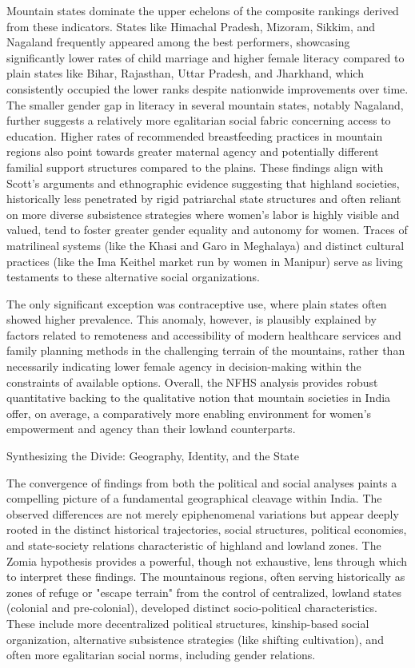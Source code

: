 \begin{sloppypar}
Mountain states dominate the upper echelons of the composite rankings derived from these indicators. States like Himachal Pradesh, Mizoram, Sikkim, and Nagaland frequently appeared among the best performers, showcasing significantly lower rates of child marriage and higher female literacy compared to plain states like Bihar, Rajasthan, Uttar Pradesh, and Jharkhand, which consistently occupied the lower ranks despite nationwide improvements over time. The smaller gender gap in literacy in several mountain states, notably Nagaland, further suggests a relatively more egalitarian social fabric concerning access to education. Higher rates of recommended breastfeeding practices in mountain regions also point towards greater maternal agency and potentially different familial support structures compared to the plains. These findings align with Scott's arguments and ethnographic evidence suggesting that highland societies, historically less penetrated by rigid patriarchal state structures and often reliant on more diverse subsistence strategies where women's labor is highly visible and valued, tend to foster greater gender equality and autonomy for women. Traces of matrilineal systems (like the Khasi and Garo in Meghalaya) and distinct cultural practices (like the Ima Keithel market run by women in Manipur) serve as living testaments to these alternative social organizations.

The only significant exception was contraceptive use, where plain states often showed higher prevalence. This anomaly, however, is plausibly explained by factors related to remoteness and accessibility of modern healthcare services and family planning methods in the challenging terrain of the mountains, rather than necessarily indicating lower female agency in decision-making within the constraints of available options. Overall, the NFHS analysis provides robust quantitative backing to the qualitative notion that mountain societies in India offer, on average, a comparatively more enabling environment for women's empowerment and agency than their lowland counterparts.

Synthesizing the Divide: Geography, Identity, and the State

The convergence of findings from both the political and social analyses paints a compelling picture of a fundamental geographical cleavage within India. The observed differences are not merely epiphenomenal variations but appear deeply rooted in the distinct historical trajectories, social structures, political economies, and state-society relations characteristic of highland and lowland zones. The Zomia hypothesis provides a powerful, though not exhaustive, lens through which to interpret these findings. The mountainous regions, often serving historically as zones of refuge or "escape terrain" from the control of centralized, lowland states (colonial and pre-colonial), developed distinct socio-political characteristics. These include more decentralized political structures, kinship-based social organization, alternative subsistence strategies (like shifting cultivation), and often more egalitarian social norms, including gender relations.


\end{sloppypar}
